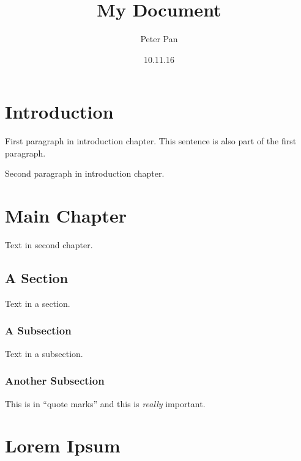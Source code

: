 \documentclass[a4paper]{report}
\author{Peter Pan}
\title{My Document}
\date{10.11.16}
\begin{document}
\maketitle
\tableofcontents

\chapter{Introduction}
First paragraph in introduction chapter.
This sentence is also part of the first paragraph.

Second paragraph in introduction chapter.

\chapter{Main Chapter}
Text in second chapter.

\section{A Section}
Text in a section.

\subsection{A Subsection}
Text in a subsection.

\subsection{Another Subsection}
This is in ``quote marks'' and this is \emph{really} important.

\chapter{Lorem Ipsum}
\lipsum[1-3]
\end{document}
